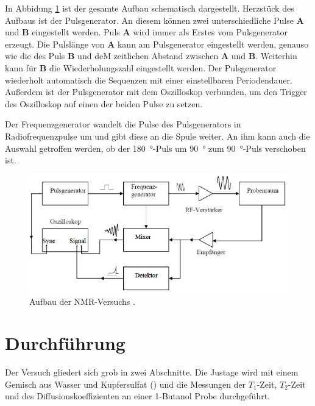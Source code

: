 In Abbidung \ref{fig:Aufbau} ist der gesamte Aufbau schematisch dargestellt.
Herzstück des Aufbaus ist der Pulsgenerator.
An diesem können zwei unterschiedliche Pulse \textbf{A} und \textbf{B} eingestellt werden.
Puls \textbf{A} wird immer als Erstes vom Pulsgenerator erzeugt.
Die Pulslänge von \textbf{A} kann am Pulsgenerator eingestellt werden, genauso wie die des Puls \textbf{B} und deM zeitlichen Abstand zwischen \textbf{A} und \textbf{B}.
Weiterhin kann für \textbf{B} die Wiederholungszahl eingestellt werden.
Der Pulsgenerator wiederholt automatisch die Sequenzen mit einer einstellbaren Periodendauer.
Außerdem ist der Pulsgenerator mit dem Oszilloskop verbunden, um den Trigger des Oszilloskop auf einen der beiden Pulse zu setzen.

Der Frequenzgenerator wandelt die Pulse des Pulsgenerators in Radiofrequenzpulse um und gibt diese an die Spule weiter.
An ihm kann auch die Auswahl getroffen werden, ob der \SI{180}{\degree}-Puls um \SI{90}{\degree} zum \SI{90}{\degree}-Puls verschoben ist.

\begin{figure}[H]
  \centering
  \includegraphics[width = .7\textwidth]{Aufbau.png}
  \caption{Aufbau der NMR-Versuchs \cite{Aachen}.}
  \label{fig:Aufbau}
\end{figure}




\section{Durchführung}
Der Versuch gliedert sich grob in zwei Abschnitte. Die Justage wird mit einem Gemisch aus Wasser und Kupfersulfat () und die Messungen der $T_1$-Zeit, $T_2$-Zeit und des Diffusionskoeffizienten an einer 1-Butanol Probe durchgeführt.


